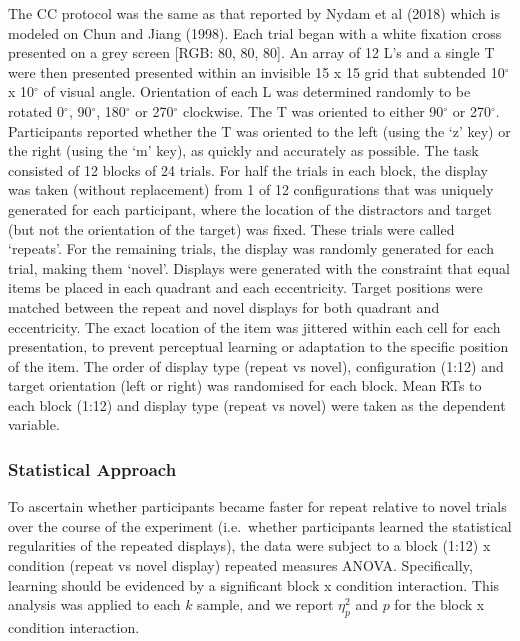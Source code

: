 \documentclass{article}
\begin{document}
The CC protocol was the same as that reported by Nydam et al (2018) which is modeled on Chun and Jiang (1998). Each trial began with a white fixation cross presented on a grey screen {[}RGB: 80, 80, 80{]}. An array of 12 L's and a single T were then presented presented within an invisible 15 x 15 grid that subtended 10\(^\circ\) x 10\(^\circ\) of visual angle. Orientation of each L was determined randomly to be rotated 0\(^\circ\), 90\(^\circ\), 180\(^\circ\) or 270\(^\circ\) clockwise. The T was oriented to either 90\(^\circ\) or 270\(^\circ\). Participants reported whether the T was oriented to the left (using the `z' key) or the right (using the `m' key), as quickly and accurately as possible. The task consisted of 12 blocks of 24 trials. For half the trials in each block, the display was taken (without replacement) from 1 of 12 configurations that was uniquely generated for each participant, where the location of the distractors and target (but not the orientation of the target) was fixed. These trials were called `repeats'. For the remaining trials, the display was randomly generated for each trial, making them `novel'. Displays were generated with the constraint that equal items be placed in each quadrant and each eccentricity. Target positions were matched between the repeat and novel displays for both quadrant and eccentricity. The exact location of the item was jittered within each cell for each presentation, to prevent perceptual learning or adaptation to the specific position of the item. The order of display type (repeat vs novel), configuration (1:12) and target orientation (left or right) was randomised for each block. Mean RTs to each block (1:12) and display type (repeat vs novel) were taken as the dependent variable.

\hypertarget{statistical-approach-1}{%
\subsubsection{Statistical Approach}\label{statistical-approach-1}}

To ascertain whether participants became faster for repeat relative to novel trials over the course of the experiment (i.e.~whether participants learned the statistical regularities of the repeated displays), the data were subject to a block (1:12) x condition (repeat vs novel display) repeated measures ANOVA. Specifically, learning should be evidenced by a significant block x condition interaction. This analysis was applied to each \(k\) sample, and we report \(\eta_{p}^2\) and \(p\) for the block x condition interaction.
\end{document}
